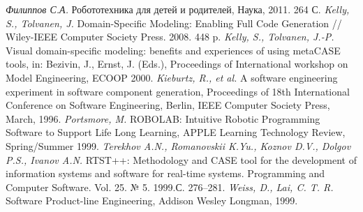 \documentclass[a4]{article}
\begin{document}
\begin{thebibliography}{9001}
 \emph{Филиппов С.А.} Робототехника для детей и родителей, Наука, 2011. 264 С.
 \emph{Kelly, S., Tolvanen, J.} Domain-Specific Modeling: Enabling Full Code Generation // Wiley-IEEE Computer Society Press. 2008. 448 p.
 \emph{Kelly, S., Tolvanen, J.-P.} Visual domain-specific modeling: benefits and experiences of using metaCASE tools, in: Bezivin, J., Ernst, J. (Eds.), Proceedings of International workshop on Model Engineering, ECOOP 2000.
 \emph{Kieburtz, R., et al.} A software engineering experiment in software component generation, Proceedings of 18th International Conference on Software Engineering, Berlin, IEEE Computer Society Press, March, 1996.
 \emph{Portsmore, M.} ROBOLAB: Intuitive Robotic Programming Software to Support Life Long Learning, APPLE Learning Technology Review, Spring/Summer 1999.
 \emph{Terekhov A.N., Romanovskii K.Yu., Koznov D.V., Dolgov P.S., Ivanov A.N.} RTST++: Methodology and CASE tool for the development of information systems and software for real-time systems. Programming and Computer Software. Vol. 25. № 5. 1999.С. 276--281.
 \emph{Weiss, D., Lai, C. T. R.} Software Product-line Engineering, Addison Wesley Longman, 1999.
\end{thebibliography}
\end{document}
